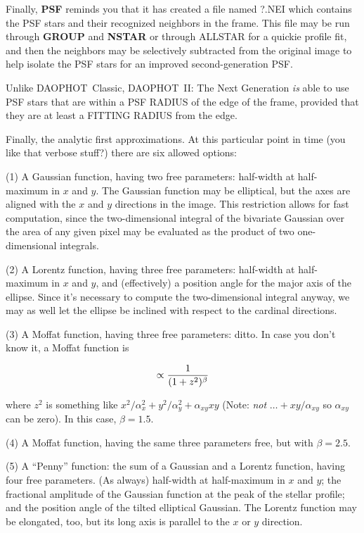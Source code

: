 Finally, {\bf PSF} reminds you that it has created a file named
?.NEI which contains the PSF stars and their recognized neighbors
in the frame.  This file may be run through {\bf GROUP} and
{\bf NSTAR} or through ALLSTAR for a quickie profile fit, and
then the neighbors may be selectively subtracted from the original
image to help isolate the PSF stars for an improved second-generation
PSF.

Unlike DAOPHOT~Classic, DAOPHOT~II: The Next Generation {\it is\/}
able to use PSF stars that are within a PSF RADIUS of the edge of
the frame, provided that they are at least a FITTING RADIUS from
the edge.

Finally, the analytic first approximations.  At this particular point
in time (you like that verbose stuff?) there are six allowed options:

\item{(1)} A Gaussian function, having two free parameters:  half-width
at half-maximum in $x$ and $y$.  The Gaussian function may be elliptical,
but the axes are aligned with the $x$ and $y$ directions in the image.
This restriction allows for fast computation, since the two-dimensional
integral of the bivariate Gaussian over the area of any given pixel
may be evaluated as the product of two one-dimensional integrals.

\item{(2)} A Lorentz function, having three free parameters: half-width
at half-maximum in $x$ and $y$, and (effectively) a position angle for
the major axis of the ellipse.  Since it's necessary to compute the
two-dimensional integral anyway, we may as well let the ellipse be
inclined with respect to the cardinal directions.

\item{(3)} A Moffat function, having three free parameters: ditto.
In case you don't know it, a Moffat function is

$$ \propto{1\over{(1 + z^2)^\beta}}$$

\item{} where $z^2$ is something like ${x^2/\alpha_x^2} +
{y^2/\alpha_y^2} + {\alpha_{xy} x y}$ (Note: {\it not\/} $\ldots +
{xy/\alpha_{xy}}$ so $\alpha_{xy}$ can be zero).  In this case, $\beta
= 1.5$.

\item{(4)} A Moffat function, having the same three parameters free,
but with $\beta = 2.5$.

\item{(5)}  A ``Penny'' function: the sum of a Gaussian and a Lorentz
function, having four free parameters.  (As always) half-width at
half-maximum in $x$ and $y$; the fractional amplitude of the
Gaussian function at the peak of the stellar profile; and the position
angle of the tilted elliptical Gaussian.  The Lorentz function may
be elongated, too, but its long axis is parallel to the $x$ or
$y$ direction.


